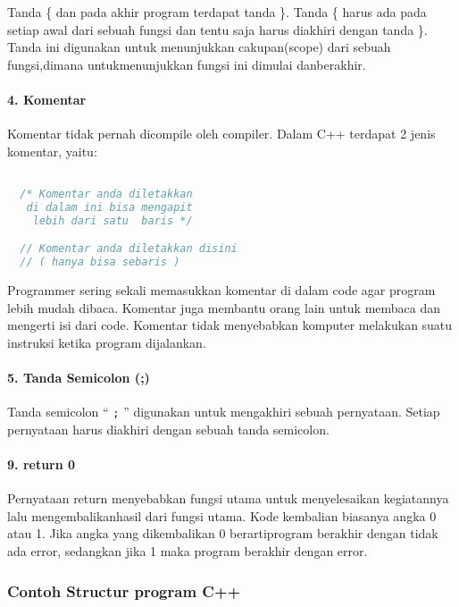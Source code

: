 Tanda \{ dan pada akhir program terdapat tanda \}. Tanda \{ harus ada
pada setiap awal dari sebuah fungsi dan tentu saja harus diakhiri dengan
tanda \}. Tanda ini digunakan untuk menunjukkan cakupan(scope) dari
sebuah fungsi,dimana untukmenunjukkan fungsi ini dimulai danberakhir.

\paragraph{4. Komentar}\label{komentar}

Komentar tidak pernah dicompile oleh compiler. Dalam C++ terdapat 2
jenis komentar, yaitu:

\begin{lstlisting}[language=c++, numbers=none]

  /* Komentar anda diletakkan
   di dalam ini bisa mengapit
    lebih dari satu  baris */

  // Komentar anda diletakkan disini
  // ( hanya bisa sebaris )
\end{lstlisting}

Programmer sering sekali memasukkan komentar di dalam code agar program
lebih mudah dibaca. Komentar juga membantu orang lain untuk membaca dan
mengerti isi dari code. Komentar tidak menyebabkan komputer melakukan
suatu instruksi ketika program dijalankan.

\paragraph{5. Tanda Semicolon (;)}\label{tanda-semicolon}

Tanda semicolon `` \texttt{;} '' digunakan untuk mengakhiri sebuah
pernyataan. Setiap pernyataan harus diakhiri dengan sebuah tanda
semicolon.

\paragraph{9. return 0}\label{return-0}

Pernyataan return menyebabkan fungsi utama untuk menyelesaikan
kegiatannya lalu mengembalikanhasil dari fungsi utama. Kode kembalian
biasanya angka 0 atau 1. Jika angka yang dikembalikan 0 berartiprogram
berakhir dengan tidak ada error, sedangkan jika 1 maka program berakhir
dengan error.

\subsubsection{Contoh Structur program C++}

